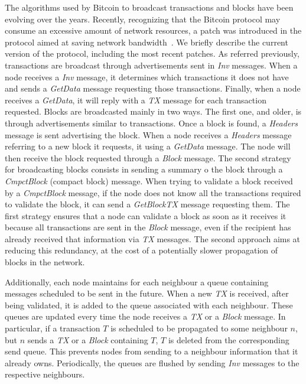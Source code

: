 \documentclass{dads}   %
\begin{document}
The algorithms used by Bitcoin to broadcast transactions and blocks have been evolving over the years. Recently, recognizing that the Bitcoin protocol may consume an excessive amount of network resources, a patch was introduced in the protocol aimed at saving network bandwidth~\cite{bip152}. We briefly describe the current version of the protocol, including the most recent patches. As referred previously, transactions are broadcast through advertisements sent in \textsl{Inv} messages. When a node receives a \textsl{Inv} message, it determines which transactions it does not have and sends a \textsl{GetData} message requesting those transactions. Finally, when a node receives a \textsl{GetData}, it will reply with a \textsl{TX} message for each transaction requested. Blocks are broadcasted mainly in two ways. The first one, and older, is through advertisements similar to transactions. Once a block is found, a \textsl{Headers} message is sent advertising the block. When a node receives a \textsl{Headers} message referring to a new block it requests, it using a \textsl{GetData} message. The node will then receive the block requested through a \textsl{Block} message. The second strategy for broadcasting blocks consists in sending a summary o the block through a \textsl{CmpctBlock} (compact block) message. When trying to validate a block received by a \textsl{CmpctBlock} message, if the node does not know all the transactions required to validate the block, it can send a \textsl{GetBlockTX} message requesting them. The first strategy ensures that a node can validate a block as soon as it receives it because all transactions are sent in the \textsl{Block} message, even if the recipient has already received that information via \textsl{TX} messages. The second approach aims at reducing this redundancy, at the cost of a potentially slower propagation of blocks in the network.

Additionally, each node maintains for each neighbour a queue containing messages scheduled to be sent in the future. When a new \textsl{TX} is received, after being validated, it is added to the queue associated with each neighbour. These queues are updated every time the node receives a \textsl{TX} or a \textsl{Block} message. In particular, if a transaction $T$ is scheduled to be propagated to some neighbour $n$, but $n$ sends a \textsl{TX} or a \textsl{Block} containing $T$, $T$ is deleted from the corresponding send queue. This prevents nodes from sending to a neighbour information that it already owns. Periodically,  the queues are flushed by sending  \textsl{Inv} messages to the respective neighbours.
\end{document}
